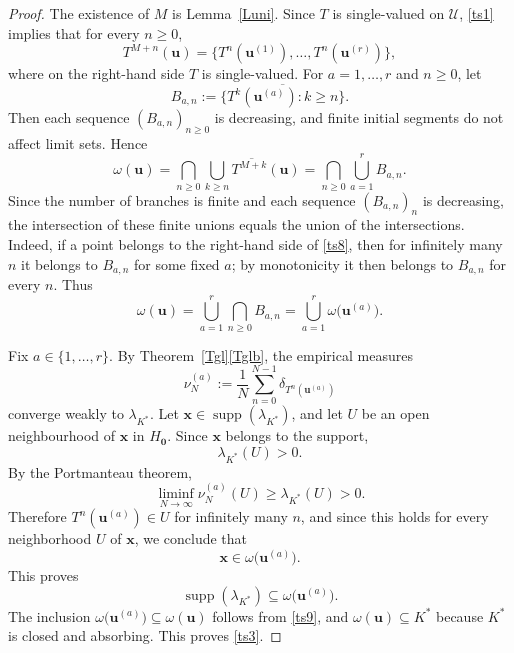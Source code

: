 \documentclass[11pt,reqno,tbtags,a4paper]{amsart}
\numberwithin{equation}{section}
\renewcommand\ge{\geq}
\renewcommand\geq{\geqslant}
\theoremstyle{plain}%
\theoremstyle{definition}
\theoremstyle{remark}
\newcommand\supp{\operatorname{supp}}
\newcommand\gl{\lambda}
\newcommand\cL{{\omega}}
\newcommand\cU{{\mathcal U}}
\newcommand\Ho{H_{\0}}
\newcommand\vu{\mathbf{u}}
\newcommand\vx{\mathbf{x}}
\newcommand\Kx{K^*}
\newcommand\0{{\boldsymbol 0}}
\newcommand\1{{\boldsymbol 1}}
\begin{document}
\begin{proof}
The existence of $M$ is Lemma~\ref{Luni}. Since $T$ is single-valued on
$\cU$, \eqref{ts1} implies that for every $n\ge0$,
\begin{equation}\label{ts6}
T^{M+n}(\vu)=\{T^n(\vu^{(1)}),\dots,T^n(\vu^{(r)})\},
\end{equation}
where on the right-hand side $T$ is single-valued. For $a=1,\dots,r$ and
$n\ge0$, let
\begin{equation}\label{ts7}
B_{a,n}:=\overline{\{T^k(\vu^{(a)}):k\ge n\}}.
\end{equation}
Then each sequence $(B_{a,n})_{n\ge0}$ is decreasing, and finite initial
segments do not affect limit sets. Hence
\begin{equation}\label{ts8}
\cL(\vu)
=
\bigcap_{n\ge0}\overline{\bigcup_{k\ge n}T^{M+k}(\vu)}
=
\bigcap_{n\ge0}\bigcup_{a=1}^r B_{a,n}.
\end{equation}
Since the number of branches is finite and each sequence $(B_{a,n})_n$ is
decreasing, the intersection of these finite unions equals the union of the
intersections.  Indeed, if a point belongs to the right-hand side
of \eqref{ts8}, then for
infinitely many $n$ it belongs to $B_{a,n}$ for some fixed $a$; by
monotonicity it then belongs to $B_{a,n}$ for every $n$.  Thus
\begin{equation}\label{ts9}
\cL(\vu)=\bigcup_{a=1}^r \bigcap_{n\ge0} B_{a,n}
=
\bigcup_{a=1}^r \omega\bigl(\vu^{(a)}\bigr).
\end{equation}

Fix $a\in\{1,\dots,r\}$. By Theorem~\ref{Tgl}\ref{Tglb}, the empirical
measures
\begin{equation}\label{ts10}
\nu_N^{(a)}:=\frac1N\sum_{n=0}^{N-1}\delta_{T^n(\vu^{(a)})}
\end{equation}
converge weakly to $\gl_{\Kx}$.
Let $\vx\in\supp(\gl_{\Kx})$, and let $U$ be an open neighbourhood of
$\vx$ in $\Ho$. Since $\vx$ belongs to the support,
\begin{equation}\label{ts11}
\gl_{\Kx}(U)>0.
\end{equation}
By the Portmanteau theorem,
\begin{equation}\label{ts12}
\liminf_{N\to\infty}\nu_N^{(a)}(U)\ge \gl_{\Kx}(U)>0.
\end{equation}
Therefore $T^n(\vu^{(a)})\in U$ for infinitely many $n$, and since this
holds for every neighborhood $U$ of $\vx$, we conclude that
\begin{equation}\label{ts13}
\vx\in\omega\bigl(\vu^{(a)}\bigr).
\end{equation}
This proves
\begin{equation}\label{ts14}
\supp(\gl_{\Kx})\subseteq \omega\bigl(\vu^{(a)}\bigr).
\end{equation}
The inclusion $\omega\bigl(\vu^{(a)}\bigr)\subseteq \cL(\vu)$ follows from
\eqref{ts9}, and $\cL(\vu)\subseteq \Kx$ because $\Kx$ is 
closed and absorbing.  This proves \eqref{ts3}.


\end{proof}
\end{document}
